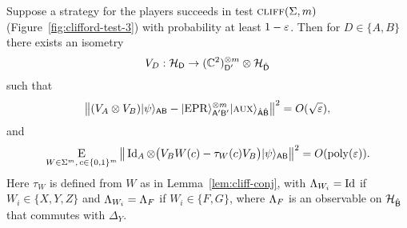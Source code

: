 \begin{theorem}\label{thm:clifford-ntest}
Suppose a strategy for the players succeeds in test $\textsc{cliff}(\Sigma,m)$ (Figure~\ref{fig:clifford-test-3}) with probability at least $1-\varepsilon$. Then  for $D\in\{A,B\}$ there exists an isometry 
$$V_D: \mathcal{H}_{\textsf{D}} \to (\mathbb{C}^2)^{\otimes m}_{{\textsf{D}}'} \otimes {\mathcal{H}}_{\hat{{\textsf{D}}}}$$
such that 
\begin{equation}\label{eq:psi-epr}
\big\| (V_A \otimes V_B) |\psi\rangle_{{\textsf{AB}}} - |{\rm EPR}\rangle_{{\textsf{A}}'{\textsf{B}}'}^{\otimes m} |\textsc {aux}\rangle_{\hat{{\textsf{A}}}\hat{{\textsf{B}}}} \big\|^2 = O(\sqrt{\varepsilon}),
\end{equation}
and %
\begin{equation}\label{eq:clifford-ntest-close}
\mathop{\textsc{E}}_{W\in\Sigma^m,\,c\in\{0,1\}^m} \big\| \mathop{\rm Id}\nolimits_A \otimes \big( V_B W(c) - \tau_{W}(c) V_B\big)   |\psi\rangle_{{\textsf{AB}}} \big\|^2 = O(\operatorname{poly}(\varepsilon)).
\end{equation}
Here $\tau_W$ is defined from $W$ as in Lemma~\ref{lem:cliff-conj}, with $\Lambda_{W_i} = \mathop{\rm Id}\nolimits$ if $W_i\in \{X,Y,Z\}$ and $\Lambda_{W_i} = \Lambda_F$ if $W_i\in\{F,G\}$, where $\Lambda_F$ is an  observable on ${\mathcal{H}}_{\hat{{\textsf{B}}}}$ that commutes with $\Delta_Y$. 
\end{theorem}

